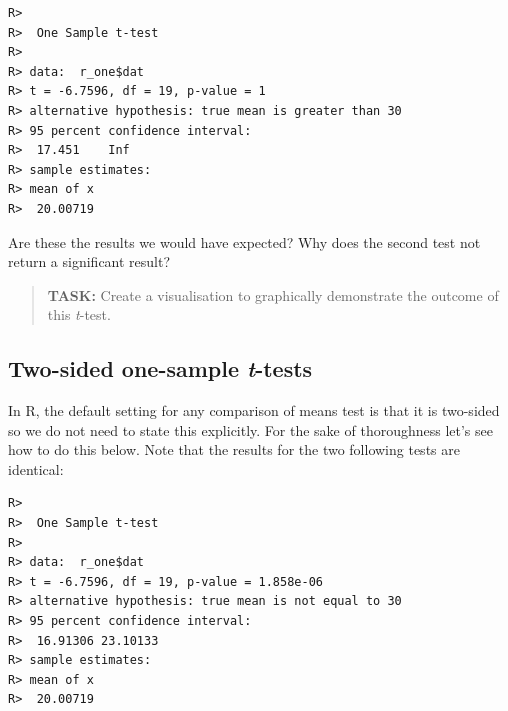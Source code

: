 \documentclass[english,10pt,a4paper,oneside]{book}
\newenvironment{Shaded}{\begin{snugshade}}{\end{snugshade}}
\newcommand{\KeywordTok}[1]{\textcolor[rgb]{0.13,0.29,0.53}{\textbf{#1}}}
\newcommand{\DataTypeTok}[1]{\textcolor[rgb]{0.13,0.29,0.53}{#1}}
\newcommand{\DecValTok}[1]{\textcolor[rgb]{0.00,0.00,0.81}{#1}}
\newcommand{\StringTok}[1]{\textcolor[rgb]{0.31,0.60,0.02}{#1}}
\newcommand{\CommentTok}[1]{\textcolor[rgb]{0.56,0.35,0.01}{\textit{#1}}}
\newcommand{\OperatorTok}[1]{\textcolor[rgb]{0.81,0.36,0.00}{\textbf{#1}}}
\newcommand{\NormalTok}[1]{#1}
\theoremstyle{definition}
\theoremstyle{definition}
\theoremstyle{definition}
\theoremstyle{remark}
\begin{document}
\begin{verbatim}
R> 
R>  One Sample t-test
R> 
R> data:  r_one$dat
R> t = -6.7596, df = 19, p-value = 1
R> alternative hypothesis: true mean is greater than 30
R> 95 percent confidence interval:
R>  17.451    Inf
R> sample estimates:
R> mean of x 
R>  20.00719
\end{verbatim}

Are these the results we would have expected? Why does the second test
not return a significant result?

\begin{quote}
\textbf{TASK:} Create a visualisation to graphically demonstrate the
outcome of this \emph{t}-test.
\end{quote}

\subsection{\texorpdfstring{Two-sided one-sample
\emph{t}-tests}{Two-sided one-sample t-tests}}\label{two-sided-one-sample-t-tests}

In R, the default setting for any comparison of means test is that it is
two-sided so we do not need to state this explicitly. For the sake of
thoroughness let's see how to do this below. Note that the results for
the two following tests are identical:

\begin{Shaded}
\end{Shaded}

\begin{verbatim}
R> 
R>  One Sample t-test
R> 
R> data:  r_one$dat
R> t = -6.7596, df = 19, p-value = 1.858e-06
R> alternative hypothesis: true mean is not equal to 30
R> 95 percent confidence interval:
R>  16.91306 23.10133
R> sample estimates:
R> mean of x 
R>  20.00719
\end{verbatim}

\begin{Shaded}
\end{Shaded}
\end{document}
